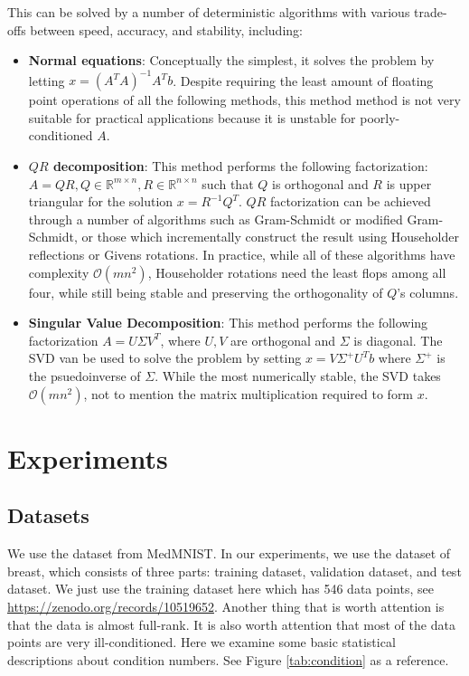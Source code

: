 \documentclass{article}
\newcommand{\bO}{\mathcal{O}}
\begin{document}
This can be solved by a number of deterministic algorithms with various trade-offs between speed, accuracy, and stability, including:
\begin{itemize}
    \item \textbf{Normal equations}:   
        Conceptually the simplest, it solves the problem by letting $x = (A^TA)^{-1}A^Tb$. Despite requiring the least amount of floating point operations of all the following methods, this method method is not very suitable for practical applications because it is unstable for poorly-conditioned $A$.
    \item \textbf{$QR$ decomposition}:
        This method performs the following factorization: $A = QR, Q \in \mathbb{R}^{m \times n}, R \in \mathbb{R}^{n \times n}$ such that $Q$ is orthogonal and $R$ is upper triangular for the solution $x = R^{-1}Q^T$. $QR$ factorization can be achieved through a number of algorithms such as Gram-Schmidt or modified Gram-Schmidt, or those which incrementally construct the result using Householder reflections or Givens rotations. In practice, while all of these algorithms have complexity $\bO(mn^2)$, Householder rotations need the least flops among all four, while still being stable and preserving the orthogonality of $Q$'s columns.
    \item \textbf{Singular Value Decomposition}:
        This method performs the following factorization $A = U \Sigma V^T$, where $U, V$ are orthogonal and $\Sigma$ is diagonal. The SVD van be used to solve the problem by setting $x = V \Sigma^+U^Tb$ where $\Sigma^+$ is the psuedoinverse of $\Sigma$. While the most numerically stable, the SVD takes $\bO(mn^2)$, not to mention the matrix multiplication required to form $x$.
\end{itemize}

\section{Experiments}
\subsection{Datasets}
We use the dataset from MedMNIST\cite{medmnistv1,medmnistv2}. In our experiments, we use the dataset of breast, which consists of three parts: training dataset, validation dataset, and test dataset. We just use the training dataset here which has 546 data points, see \href{https://zenodo.org/records/10519652} {https://zenodo.org/records/10519652}. Another thing that is worth attention is that the data is almost full-rank. It is also worth attention that most of the data points are very ill-conditioned. Here we examine some basic statistical descriptions about condition numbers. See Figure \ref{tab:condition} as a reference.
\end{document}
